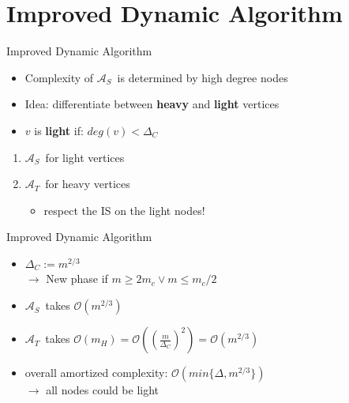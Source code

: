 \documentclass{beamer}
\newcommand{\trivial}{$\mathcal{A}_T$}
\newcommand{\simple}{$\mathcal{A}_S$}
\begin{document}
\section{Improved Dynamic Algorithm}
\begin{frame}{Improved Dynamic Algorithm}
  \begin{itemize}
    \item Complexity of \simple\ is determined by high degree nodes
    \pause
    \medskip
    \item Idea: differentiate between \textbf{heavy} and \textbf{light} vertices
    \item $v$ is \textbf{light} if: $deg(v) < \Delta_C$
  \end{itemize}
  \begin{enumerate}
    \pause
    \bigskip
    \item \simple\ for light vertices
    \medskip
    \item \trivial\ for heavy vertices
    \begin{itemize}
      \item respect the IS on the light nodes!
    \end{itemize}
  \end{enumerate} 
\end{frame}

\begin{frame}{Improved Dynamic Algorithm}
  \begin{itemize}
    \item $\Delta_C := m^{2/3}$
    \\
    \pause
    $\rightarrow$ New phase if $m \geq 2m_c \lor m \leq m_c/2$

    \pause
    \bigskip
    \item \simple\ takes $\mathcal{O}(m^{2/3})$

    \item \trivial\ takes $\mathcal{O}(m_H) = \mathcal{O}((\frac{m}{\Delta_C})^2) = \mathcal{O}(m^{2/3})$

    \pause
    \bigskip
    \item overall amortized complexity: $\mathcal{O}(min\{\Delta, m^{2/3}\})$
    \\
    $\rightarrow$ all nodes could be light
  \end{itemize}
\end{frame}
\end{document}
